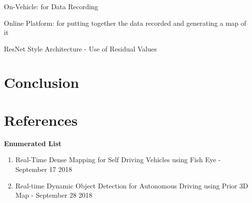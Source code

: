 \documentclass{article}
\begin{document}
	On-Vehicle: for Data Recording
	
	Online Platform: for putting together the data recorded and generating a map of it
	
	ResNet Style Architecture - Use of Residual Values 
	
	\section{Conclusion}
	
	\section{References}
	\textbf{Enumerated List}
	\begin{enumerate}
		\item Real-Time Dense Mapping for Self Driving Vehicles using Fish Eye - September 17 2018
	
		\item Real-time Dynamic Object Detection for Autonomous Driving using Prior 3D Map - September 28 2018
			
	\end{enumerate}
\end{document}
